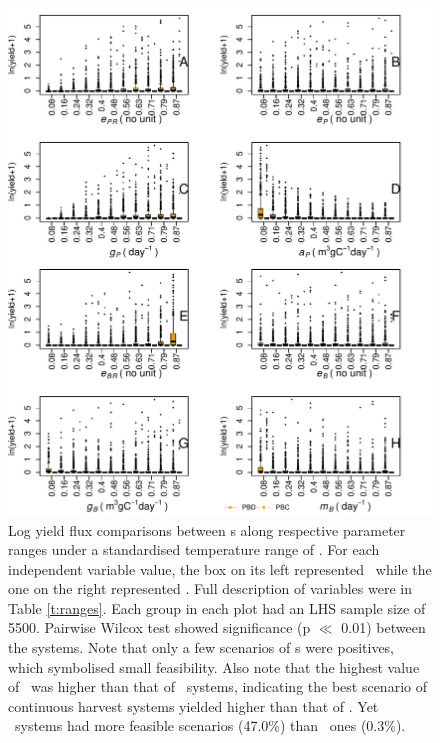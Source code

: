 \documentclass[../thesis.tex]{subfiles} %
\begin{document}
\begin{figure}[H]
    \centering
    \includegraphics[width=\linewidth]{result/harvB.pdf}
    \caption[Log yield flux comparisons between \pbs s]{Log yield flux comparisons between \pbs s along respective parameter ranges under a standardised temperature range of \temp.  For each independent variable value, the box on its left represented \PBN\ while the one on the right represented \PBH.  Full description of variables were in Table \ref{t:ranges}.  Each group in each plot had an LHS sample size of 5500.  Pairwise Wilcox test showed significance (p $\ll$ 0.01) between the systems.  Note that only a few scenarios of \pbs s were positives, which symbolised small feasibility.  Also note that the highest value of \PBH\ was higher than that of \PBN\ systems, indicating the best scenario of continuous harvest systems yielded higher than that of \PBN.  Yet \PBN\ systems had more feasible scenarios (47.0\%) than \PBH\ ones (0.3\%).}
    \label{f:harvPB}
\end{figure}
\end{document}
